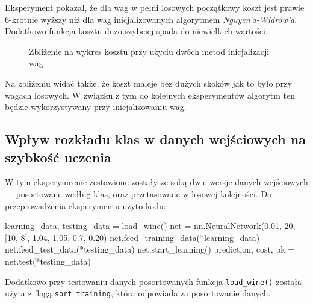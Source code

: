 \documentclass[a4paper,12pt]{article}
\numberwithin{equation}{section}
\begin{document}
Eksperyment pokazał, że dla wag w pełni losowych początkowy koszt jest prawie 6-krotnie wyższy niż dla wag inicjalizowanych algorytmem \textit{Nguyen'a-Widrow'a}. Dodatkowo funkcja kosztu dużo szybciej spada do niewielkich wartości.

\begin{figure}[!htpb]
    \centering


    \caption{Zbliżenie na wykres kosztu przy użyciu dwóch metod inicjalizacji wag}
    \label{fig:exp_1_zoom}
\end{figure}

Na zbliżeniu widać także, że koszt maleje bez dużych skoków jak to było przy wagach losowych. W związku z tym do kolejnych eksperymentów algorytm ten będzie wykorzystywany przy inicjalizowaniu wag.

\FloatBarrier
\subsection{Wpływ rozkładu klas w danych wejściowych na szybkość uczenia}

W tym eksperymecnie zestawione zostały ze sobą dwie wersje danych wejściowych — posortowane według klas, oraz przetasowane w losowej kolejności. Do przeprowadzenia eksperymentu użyto kodu:

\begin{pythoncode}
learning_data, testing_data = load_wine()
net = nn.NeuralNetwork(0.01, 20, [10, 8], 1.04, 1.05, 0.7, 0.20)
net.feed_training_data(*learning_data)
net.feed_test_data(*testing_data)
net.start_learning()
prediction, cost, pk = net.test(*testing_data)
\end{pythoncode}
Dodatkowo przy testowaniu danych posortowanych funkcja \texttt{load_wine()} została użyta z flagą \texttt{sort_training}, która odpowiada za posortowanie danych.
\end{document}
